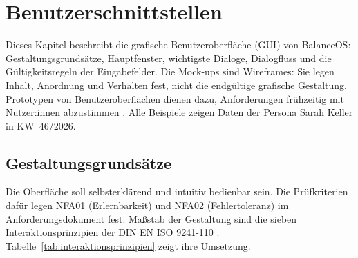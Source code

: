 \section{Benutzerschnittstellen}\label{sec:benutzerschnittstellen}
Dieses Kapitel beschreibt die grafische Benutzeroberfläche (\acs{GUI}) von BalanceOS: Gestaltungsgrundsätze, Hauptfenster, wichtigste Dialoge, Dialogfluss und die Gültigkeitsregeln der Eingabefelder. Die Mock-ups sind Wireframes: Sie legen Inhalt, Anordnung und Verhalten fest, nicht die endgültige grafische Gestaltung. Prototypen von Benutzeroberflächen dienen dazu, Anforderungen frühzeitig mit Nutzer:innen abzustimmen \parencite[S.~1-7]{swebok2026}. Alle Beispiele zeigen Daten der Persona Sarah Keller in \ac{KW}~46/2026.

\subsection{Gestaltungsgrundsätze}\label{sec:gestaltungsgrundsaetze}
Die Oberfläche soll selbsterklärend und intuitiv bedienbar sein. Die Prüfkriterien dafür legen NFA01 (Erlernbarkeit) und NFA02 (Fehlertoleranz) im Anforderungsdokument fest. Maßstab der Gestaltung sind die sieben Interaktionsprinzipien der DIN EN ISO 9241-110 \parencite[Abschn.~5]{iso9241}. Tabelle~\ref{tab:interaktionsprinzipien} zeigt ihre Umsetzung.

